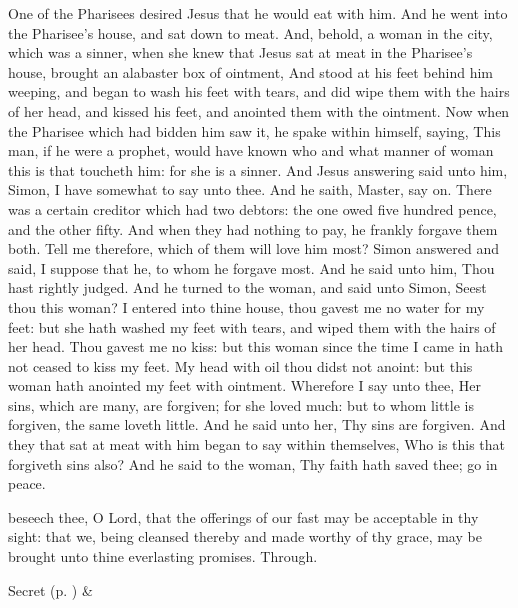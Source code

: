  One of the Pharisees desired Jesus that he would eat with him. And he went into the Pharisee's house, and sat down to meat. And, behold, a woman in the city, which was a sinner, when she knew that Jesus sat at meat in the Pharisee's house, brought an alabaster box of ointment, And stood at his feet behind him weeping, and began to wash his feet with tears, and did wipe them with the hairs of her head, and kissed his feet, and anointed them with the ointment. Now when the Pharisee which had bidden him saw it, he spake within himself, saying, This man, if he were a prophet, would have known who and what manner of woman this is that toucheth him: for she is a sinner. And Jesus answering said unto him, Simon, I have somewhat to say unto thee. And he saith, Master, say on. There was a certain creditor which had two debtors: the one owed five hundred pence, and the other fifty. And when they had nothing to pay, he frankly forgave them both. Tell me therefore, which of them will love him most? Simon answered and said, I suppose that he, to whom he forgave most. And he said unto him, Thou hast rightly judged. And he turned to the woman, and said unto Simon, Seest thou this woman? I entered into thine house, thou gavest me no water for my feet: but she hath washed my feet with tears, and wiped them with the hairs of her head. Thou gavest me no kiss: but this woman since the time I came in hath not ceased to kiss my feet. My head with oil thou didst not anoint: but this woman hath anointed my feet with ointment. Wherefore I say unto thee, Her sins, which are many, are forgiven; for she loved much: but to whom little is forgiven, the same loveth little. And he said unto her, Thy sins are forgiven. And they that sat at meat with him began to say within themselves, Who is this that forgiveth sins also? And he said to the woman, Thy faith hath saved thee; go in peace.


\secret
{} beseech thee, O Lord, that the offerings of our fast may be acceptable in thy sight: that we, being cleansed thereby and made worthy of thy grace, may be brought unto thine everlasting promises. Through.
\begin{rubric}
     Secret  (p. \pageref{SPSaints}) \&  
\end{rubric}

